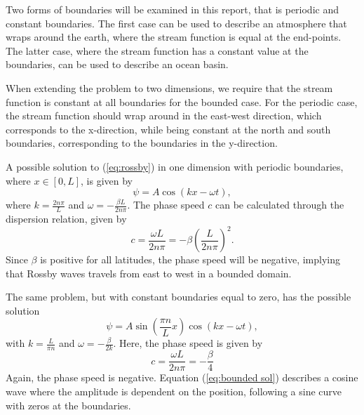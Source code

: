 Two forms of boundaries will be examined in this report, that is periodic and constant boundaries. The first case can be used to describe an atmosphere that wraps around the earth, where the stream function is equal at the end-points. The latter case, where the stream function has a constant value at the boundaries, can be used to describe an ocean basin.

When extending the problem to two dimensions, we require that the stream function is constant at all boundaries for the bounded case. For the periodic case, the stream function should wrap around in the east-west direction, which corresponds to the x-direction, while being constant at the north and south boundaries, corresponding to the boundaries in the y-direction.

A possible solution to (\ref{eq:rossby}) in one dimension with periodic boundaries, where $x \in \left[0,L \right] $, is given by
\begin{equation}\label{eq:periodic sol}
	\psi = A\cos{\left(kx-\omega t\right)},
\end{equation}
where $k=\frac{2n\pi}{L}$ and $\omega = - \frac{\beta L}{2n\pi}$. The phase speed $c$ can be calculated through the dispersion relation, given by
\begin{equation}
	c = \frac{\omega L}{2n\pi}=-\beta \left(\frac{L}{2n\pi}\right)^2.
\end{equation}
Since $\beta$ is positive for all latitudes, the phase speed will be negative, implying that Rossby waves travels from east to west in a bounded domain.

The same problem, but with constant boundaries equal to zero, has the possible solution
\begin{equation}\label{eq:bounded sol}
	\psi = A\sin\left(\frac{\pi n}{L}x\right)\cos\left(kx-\omega t\right),
\end{equation}
with $k = \frac{L}{\pi n}$ and $\omega = - \frac{\beta}{2k}$. Here, the phase speed is given by
\begin{equation}
	\label{eq:phasespeed}
	c = \frac{\omega L}{2n\pi} = - \frac{\beta}{4}
\end{equation}
Again, the phase speed is negative. Equation (\ref{eq:bounded sol}) describes a cosine wave where the amplitude is dependent on the position, following a sine curve with zeros at the boundaries.


